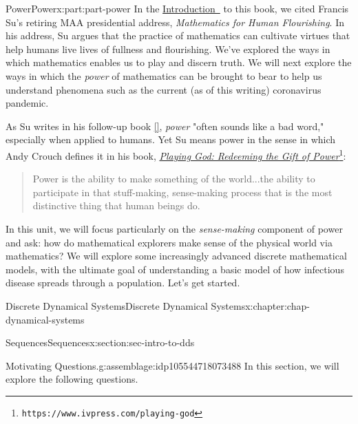 \documentclass[oneside,10pt,]{book}
\newcommand{\xreffont}{\relax}
\numberwithin{equation}{section}
\begin{document}
\begin{partptx}{Power}{}{Power}{}{}{x:part:part-power}
 In the \hyperref[x:preface:Sec-Introduction]{Introduction~} to this book, we cited Francis Su's retiring MAA presidential address, \emph{Mathematics for Human Flourishing}. In his address, Su argues that the practice of mathematics can cultivate virtues that help humans live lives of fullness and flourishing. We've explored the ways in which mathematics enables us to play and discern truth. We will next explore the ways in which the \emph{power} of mathematics can be brought to bear to help us understand phenomena such as the current (as of this writing) coronavirus pandemic.%
\par
As Su writes in his follow-up book \hyperlink{x:biblio:Su2020}{[{\xreffont 1}]}, \emph{power} "often sounds like a bad word," especially when applied to humans. Yet Su means power in the sense in which Andy Crouch defines it in his book, \href{https://www.ivpress.com/playing-god}{\emph{Playing God: Redeeming the Gift of Power}}\footnote{\nolinkurl{https://www.ivpress.com/playing-god}\label{g:fn:idp105544718070288}}:%
\begin{quote}%
Power is the ability to make something of the world...the ability to participate in that stuff-making, sense-making process that is the most distinctive thing that human beings do.\end{quote}
In this unit, we will focus particularly on the \emph{sense-making} component of power and ask: how do mathematical explorers make sense of the physical world via mathematics? We will explore some increasingly advanced discrete mathematical models, with the ultimate goal of understanding a basic model of how infectious disease spreads through a population. Let's get started.%
%
\typeout{************************************************}
\typeout{************************************************}
%
\begin{chapterptx}{Discrete Dynamical Systems}{}{Discrete Dynamical Systems}{}{}{x:chapter:chap-dynamical-systems}
%
%
\typeout{************************************************}
\typeout{************************************************}
%
\begin{sectionptx}{Sequences}{}{Sequences}{}{}{x:section:sec-intro-to-dds}
\begin{assemblage}{Motivating Questions.}{g:assemblage:idp105544718073488}%
In this section, we will explore the following questions. %
\begin{enumerate}

\end{enumerate}
\end{assemblage}
\end{sectionptx}
\end{chapterptx}
\end{partptx}
\end{document}
